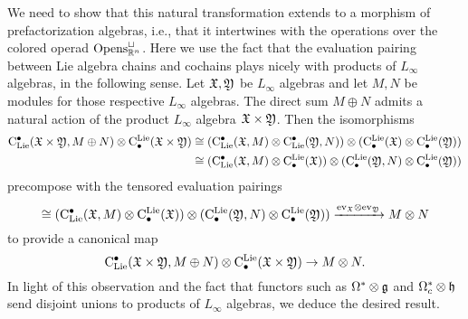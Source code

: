 \documentclass[11pt]{amsart}
\numberwithin{equation}{section}
\begin{document}

We need to show that this natural transformation extends to a morphism of prefactorization algebras,
i.e., that it intertwines with the operations over the colored operad ${\rm Opens}_{\mathbb R^n}^\sqcup$.
Here we use the fact that the evaluation pairing between Lie algebra chains and cochains plays nicely with products of $L_\infty$ algebras, in the following sense.
Let $\mathfrak X, \mathfrak Y$ be $L_\infty$ algebras and let $M, N$ be modules for those respective $L_\infty$ algebras.
The direct sum $M \oplus N$ admits a natural action of the product $L_\infty$ algebra $\mathfrak X \times \mathfrak Y$.
Then the isomorphisms
\begin{align*}
{\rm C}_{\rm Lie}^\bullet(\mathfrak X \times \mathfrak Y, M \oplus N) \otimes {\rm C}^{\rm Lie}_\bullet(\mathfrak X \times \mathfrak Y) 
&\cong ({\rm C}_{\rm Lie}^\bullet(\mathfrak X, M) \otimes {\rm C}_{\rm Lie}^\bullet(\mathfrak Y,N) ) \otimes ({\rm C}^{\rm Lie}_\bullet(\mathfrak X) \otimes {\rm C}^{\rm Lie}_\bullet(\mathfrak Y) ) \\
&\cong ({\rm C}_{\rm Lie}^\bullet(\mathfrak X,M) \otimes {\rm C}^{\rm Lie}_\bullet(\mathfrak X) ) \otimes ({\rm C}^{\rm Lie}_\bullet(\mathfrak Y,N) \otimes {\rm C}^{\rm Lie}_\bullet(\mathfrak Y) )
\end{align*}
precompose with the tensored evaluation pairings
\[
\cong ({\rm C}_{\rm Lie}^\bullet(\mathfrak X,M) \otimes {\rm C}^{\rm Lie}_\bullet(\mathfrak X) ) \otimes ({\rm C}^{\rm Lie}_\bullet(\mathfrak Y,N) \otimes {\rm C}^{\rm Lie}_\bullet(\mathfrak Y) ) \xrightarrow{{\rm ev}_\mathfrak X \otimes {\rm ev}_\mathfrak Y} M \otimes N
\]
to provide a canonical map
\[
{\rm C}_{\rm Lie}^\bullet(\mathfrak X \times \mathfrak Y, M \oplus N) \otimes {\rm C}^{\rm Lie}_\bullet(\mathfrak X \times \mathfrak Y) \to M \otimes N.
\]
In light of this observation and the fact that functors such as $\Omega^* \otimes \mathfrak g$ and $\Omega^*_c \otimes \mathfrak h$ send disjoint unions to products of $L_\infty$ algebras,
we deduce the desired result.
\end{document}
